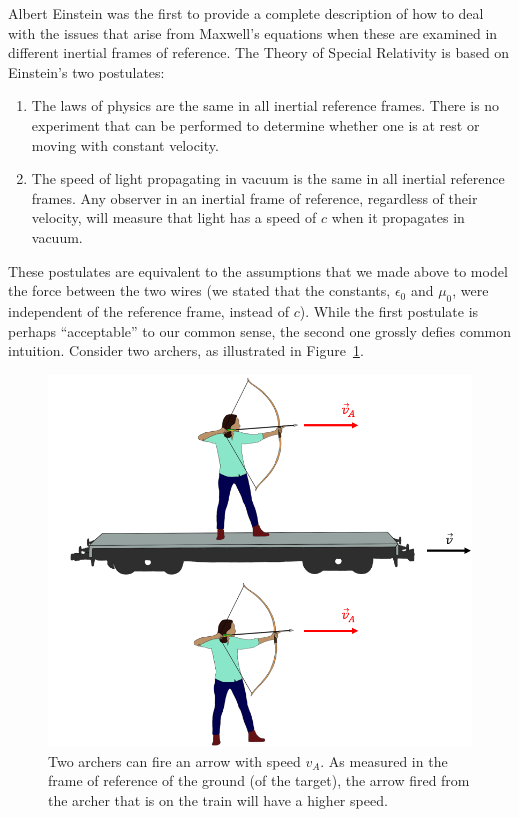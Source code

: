 
Albert Einstein was the first to provide a complete description of how to deal with the issues that arise from Maxwell's equations when these are examined in different inertial frames of reference. The Theory of Special Relativity is based on Einstein's two postulates:

\begin{enumerate}
\item The laws of physics are the same in all inertial reference frames. There is no experiment that can be performed to determine whether one is at rest or moving with constant velocity.
\item The speed of light propagating in vacuum is the same in all inertial reference frames. Any observer in an inertial frame of reference, regardless of their velocity, will measure that light has a speed of $c$ when it propagates in vacuum.
\end{enumerate}

These postulates are equivalent to the assumptions that we made above to model the force between the two wires (we stated that the constants, $\epsilon_0$ and $\mu_0$, were independent of the reference frame, instead of $c$). While the first postulate is perhaps ``acceptable'' to our common sense, the second one grossly defies common intuition. Consider two archers, as illustrated in Figure~\ref{fig:specialrelativity:arrow}.

\begin{figure}[!htbp]
\centering
\includegraphics[width=0.5\linewidth]{files/arrow-e43be0a8321345241200b467b38d2883.png}
\caption[]{Two archers can fire an arrow with speed $v_A$. As measured in the frame of reference of the ground (of the target), the arrow fired from the archer that is on the train will have a higher speed.}
\label{fig:specialrelativity:arrow}
\end{figure}

